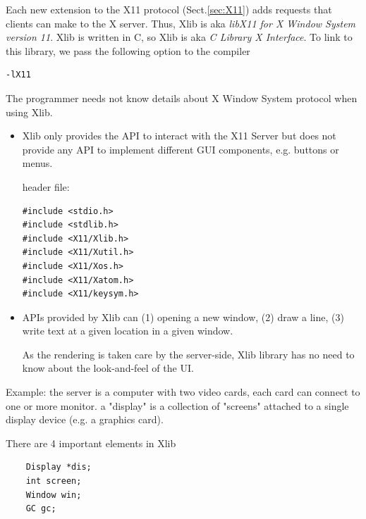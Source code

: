 Each new extension to the X11 protocol (Sect.\ref{sec:X11}) adds requests that
clients can make to the X server.
Thus, Xlib is aka {\it libX11 for X Window System version 11}. Xlib is written
in C, so Xlib is aka {\it C Library X Interface}. To link to this library, we
pass the following option to the compiler
\begin{verbatim}
-lX11
\end{verbatim}

The programmer needs not know details about X Window System protocol when using
Xlib.
\begin{itemize}
  \item Xlib only provides the API to interact with the X11 Server but does not
  provide any API to implement different GUI components, e.g. buttons or menus.

header file:
\begin{verbatim}
#include <stdio.h>
#include <stdlib.h>
#include <X11/Xlib.h>
#include <X11/Xutil.h>
#include <X11/Xos.h>
#include <X11/Xatom.h>
#include <X11/keysym.h>
\end{verbatim}

  \item APIs provided by Xlib can (1) opening a new window, (2) draw a line, (3)
  write text at a given location in a given window.

As the rendering is taken care by the server-side, Xlib library has no need to
know about the look-and-feel of the UI. 

\end{itemize}

Example: the server is a computer with two video cards, each card can connect to
one or more monitor.  a "display" is a collection of "screens" attached to a
single display device (e.g. a graphics card).

There are 4 important elements in Xlib
\begin{verbatim}
	Display *dis;
	int screen;
	Window win;
	GC gc;
\end{verbatim}


